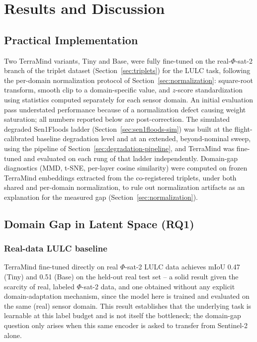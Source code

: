 \chapter{Results and Discussion}
\label{chap:results-discussion}

\section{Practical Implementation}
\label{sec:practical-implementation}

Two TerraMind variants, Tiny and Base, were fully fine-tuned on the real-$\Phi$-sat-2 branch of the triplet dataset (Section~\ref{sec:triplets}) for the LULC task, following the per-domain normalization protocol of Section~\ref{sec:normalization}: square-root transform, smooth clip to a domain-specific value, and $z$-score standardization using statistics computed separately for each sensor domain.
An initial evaluation pass understated performance because of a normalization defect causing weight saturation; all numbers reported below are post-correction.
The simulated degraded Sen1Floods ladder (Section~\ref{sec:sen1floods-sim}) was built at the flight-calibrated baseline degradation level and at an extended, beyond-nominal sweep, using the pipeline of Section~\ref{sec:degradation-pipeline}, and TerraMind was fine-tuned and evaluated on each rung of that ladder independently.
Domain-gap diagnostics (MMD, t-SNE, per-layer cosine similarity) were computed on frozen TerraMind embeddings extracted from the co-registered triplets, under both shared and per-domain normalization, to rule out normalization artifacts as an explanation for the measured gap (Section~\ref{sec:normalization}).

\section{Domain Gap in Latent Space (RQ1)}
\label{sec:rq1-results}

\subsection{Real-data LULC baseline}

TerraMind fine-tuned directly on real $\Phi$-sat-2 LULC data achieves mIoU 0.47 (Tiny) and 0.51 (Base) on the held-out real test set -- a solid result given the scarcity of real, labeled $\Phi$-sat-2 data, and one obtained without any explicit domain-adaptation mechanism, since the model here is trained and evaluated on the same (real) sensor domain.
This result establishes that the underlying task is learnable at this label budget and is not itself the bottleneck; the domain-gap question only arises when this same encoder is asked to transfer from Sentinel-2 alone.

